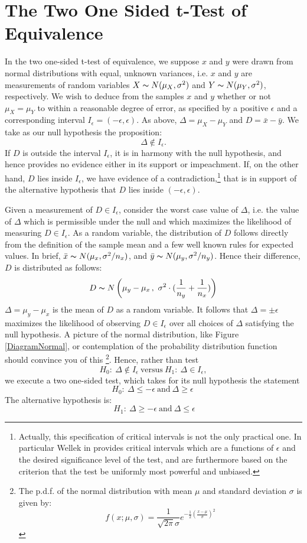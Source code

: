  \section{The Two One Sided t-Test of Equivalence}
\label{TOST}

In the two one-sided t-test of equivalence, we suppose $x$ and $y$ were drawn from normal distributions with equal, unknown variances, i.e. $x$ and $y$ are measurements of random variables  $X \thicksim N(\mu_X, \sigma^2)$ and $Y \thicksim N(\mu_Y, \sigma^2)$, respectively. We wish to deduce from the samples $x$ and $y$ whether or not $\mu_X = \mu_Y$ to within a reasonable degree of error, as specified by a positive $\epsilon$ and a corresponding interval $I_\epsilon = (-\epsilon, \epsilon)$. As above, $\Delta = \mu_X - \mu_Y$ and $D = \bar{x} - \bar{y}$. We take as our null hypothesis the proposition:
\[ \Delta \notin I_\epsilon. \]
If $D$ is outside the interval $I_\epsilon$, it is in harmony with the null hypothesis, and hence provides no evidence either in its support or impeachment.  If, on the other hand, $D$ lies inside $I_\epsilon$, we have evidence of a contradiction,\footnote{Actually, this specification of critical intervals is not the only practical one. In particular Wellek in \cite{wellek} provides critical intervals which are a functions of $\epsilon$ and the desired significance level of the test, and are furthermore based on the criterion that the test be uniformly most powerful and unbiased.} that is in support of the alternative hypothesis that $D$ lies inside $(-\epsilon, \epsilon).$

Given a measurement of $D \in I_\epsilon$, consider the worst case value of $\Delta $, i.e. the value of $\Delta$ which is permissible under the null and which maximizes the likelihood of measuring $D \in I_\epsilon$. As a random variable, the distribution of $D$ follows directly from the definition of the sample mean and a few well known rules for expected values. In brief, $\bar{x} \thicksim N(\mu_x, \sigma^2/ n_x)$, and $\bar{y} \thicksim N(\mu_y, \sigma^2/n_y)$. Hence their difference, $D$ is distributed as follows:
\begin{eqnarray}
D \thicksim N\left( \mu_y - \mu_x \,,\ \sigma^2 \cdot ( \frac{1}{n_y} + \frac{1}{n_x} ) \right)
\end{eqnarray}
 $\Delta = \mu_y - \mu_x$ is the mean of $D$ as a random variable. It follows that $\Delta = \pm \epsilon$ maximizes the likelihood of observing  $D \in I_\epsilon$ over all choices of $\Delta$ satisfying the null hypothesis.  A picture of the normal distribution, like Figure \ref{DiagramNormal}, or contemplation of the probability distribution function should convince you of this \footnote{The p.d.f. of the normal distribution with mean $\mu$ and standard deviation $\sigma$ is given by: \[ f(x; \mu, \sigma) =\frac{1}{\sqrt{2\pi}\sigma}e^{-\frac{1}{2}\left(\frac{x-\mu}{\sigma}\right)^2 } \] }. Hence, rather than test $$H_0: \ \Delta \notin I_\epsilon
\  \mbox{versus} \ H_1: \ \Delta \in I_\epsilon,$$ we execute a two one-sided test, which takes for its null hypothesis the statement  $$H_0: \ \Delta \leq  -\epsilon \ \mbox{and} \ \Delta \geq \epsilon \ $$ The alternative hypothesis is: $$ \ H_1: \  \Delta \geq  -\epsilon \ \mbox{and}\  \Delta \leq \epsilon  $$

